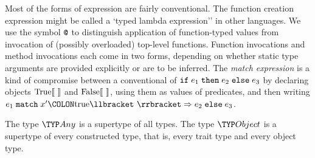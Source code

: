 Most of the forms of expression are fairly conventional.  The function creation expression
might be called a `typed lambda expression'' in other languages.  We use the symbol $\apply$ to
distinguish application of function-typed values from invocation of (possibly overloaded) top-level functions.
Function invocations and method invocations each come in two forms, depending on whether static type arguments
are provided explicitly or are to be inferred.  The \emph{match expression} is a kind of compromise between
a conventional %
of $\mathtt{if}\;e_1\;\mathtt{then}\;e_2\;\mathtt{else}\;e_3$ by declaring objects $\mathrm{True}\ob{\,}$ and $\mathrm{False}\ob{\,}$,
using them as values of predicates, and then writing
$e_1\;\kwd{match}\;x'\COLON \mathrm{true}\ob{\,} \Rightarrow e_2 \;\kwd{else}\;e_3$.

The type $\Any$ is a supertype of all types. The type $\Object$ is a supertype of every constructed type, that is, every trait type and every object type.
